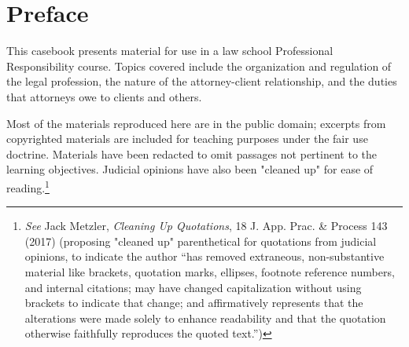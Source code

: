 \clearpage


\thispagestyle{empty}

\vspace*{\fill}
\vspace*{\fill}

\chapter*{Preface}

This casebook presents material for use in a law school Professional Responsibility course. Topics covered include the organization and regulation of the legal profession, the nature of the attorney-client relationship, and the duties that attorneys owe to clients and others.

Most of the materials reproduced here are in the public domain; excerpts from copyrighted materials are included for teaching purposes under the fair use doctrine. Materials have been redacted to omit passages not pertinent to the learning objectives. Judicial opinions have also been "cleaned up" for ease of reading.\footnote{\textit{See} Jack Metzler, {\textit{Cleaning Up Quotations}}, 18 J. App. Prac. \& Process 143 (2017) (proposing "cleaned up" parenthetical for quotations from judicial opinions, to indicate the author “has removed extraneous, non-substantive material like brackets, quotation marks, ellipses, footnote reference numbers, and internal citations; may have changed capitalization without using brackets to indicate that change; and affirmatively represents that the alterations were made solely to enhance readability and that the quotation otherwise faithfully reproduces the quoted text.”)} 